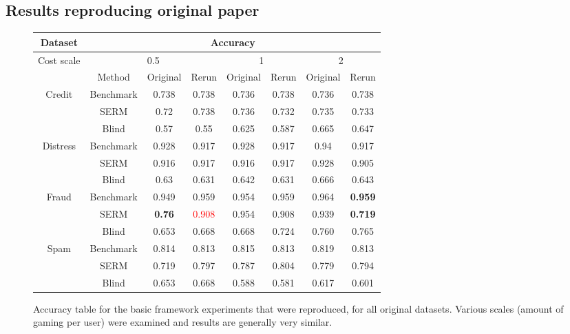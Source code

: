 \subsection{Results reproducing original paper}
\begin{figure}[h]
    \centering
    \begin{tabular}{|c|c|c|c|c|c|c|c|} \hline
 
    Dataset & \multicolumn{7}{|c|}{Accuracy} \\\hline
    Cost scale & \multicolumn{3}{|c|}{0.5} & \multicolumn{2}{|c|}{1}& \multicolumn{2}{|c|}{2}\\\hline
    & Method & Original & Rerun & Original & Rerun & Original & Rerun\\\hline
    \multirow{3}{4em}{Credit}   & Benchmark     & 0.738 & 0.738 & 0.736 & 0.738 & 0.736 & 0.738\\
                                & SERM          & 0.72 & 0.738 & 0.736 & 0.732 & 0.735& 0.733 \\
                                & Blind         & 0.57 & 0.55 &0.625 & 0.587 & 0.665 & 0.647\\\hline
    \multirow{3}{4em}{Distress} & Benchmark     & 0.928 & 0.917 & 0.928 & 0.917 & 0.94 & 0.917\\
                                & SERM          & 0.916 & 0.917 & 0.916 & 0.917 & 0.928 & 0.905\\
                                & Blind         & 0.63 & 0.631 & 0.642 & 0.631 & 0.666 & 0.643\\\hline
    \multirow{3}{4em}{Fraud}    & Benchmark     & 0.949 & 0.959 & 0.954 & 0.959 & 0.964 & \textbf{0.959} \\
                                & SERM          & \textbf{0.76} & \textcolor{red}{0.908}& 0.954 & 0.908 & 0.939 & \textbf{0.719}\\
                                & Blind         & 0.653 & 0.668 & 0.668 & 0.724 & 0.760 & 0.765\\\hline
    \multirow{3}{4em}{Spam}     & Benchmark     & 0.814 & 0.813 & 0.815 & 0.813 & 0.819 & 0.813\\
                                & SERM          & 0.719 & 0.797 & 0.787 & 0.804 & 0.779 & 0.794\\
                                & Blind         & 0.653 & 0.668 & 0.588 & 0.581 & 0.617 & 0.601\\\hline
\end{tabular}
    \caption{Accuracy table for the basic framework experiments that were reproduced, for all original datasets. Various scales (amount of gaming per user) were examined and results are generally very similar.}
    \label{tab:accuracies}
\end{figure}

